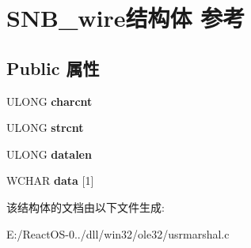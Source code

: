 \hypertarget{struct_s_n_b__wire}{}\section{S\+N\+B\+\_\+wire结构体 参考}
\label{struct_s_n_b__wire}
\subsection*{Public 属性}
\begin{DoxyCompactItemize}
\item 
\mbox{\label{struct_s_n_b__wire_acf066b74e1fbf608f733bdfe574ce0b1}} 
U\+L\+O\+NG {\bfseries charcnt}
\item 
\mbox{\label{struct_s_n_b__wire_a7f00bb4955a946f4936bf4ed848c8c08}} 
U\+L\+O\+NG {\bfseries strcnt}
\item 
\mbox{\label{struct_s_n_b__wire_ac12e36985e3accf2488e2187d526a183}} 
U\+L\+O\+NG {\bfseries datalen}
\item 
\mbox{\label{struct_s_n_b__wire_a54477bd45ac6541c61c95fc4296c17fd}} 
W\+C\+H\+AR {\bfseries data} \mbox{[}1\mbox{]}
\end{DoxyCompactItemize}


该结构体的文档由以下文件生成\+:\begin{DoxyCompactItemize}
\item 
E\+:/\+React\+O\+S-\/0../dll/win32/ole32/usrmarshal.\+c\end{DoxyCompactItemize}
